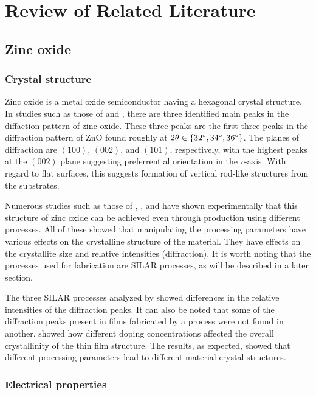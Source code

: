 \chapter{Review of Related Literature}

\section{Zinc oxide}

\subsection{Crystal structure}

Zinc oxide is a metal oxide semiconductor having a hexagonal crystal structure.
In studies such as those of  and , there are three identified main peaks in the diffaction pattern of zinc oxide.
These three peaks are the first three peaks in the diffraction pattern of ZnO found roughly at $2\theta \in \{32^{\circ} , 34^{\circ} , 36^{\circ}\}$.
The planes of diffraction are $(100)$, $(002)$, and $(101)$, respectively, with the highest peaks at the $(002)$ plane suggesting preferrential orientation in the \textit{c}-axis.
With regard to flat surfaces, this suggests formation of vertical rod-like structures from the substrates.

Numerous studies such as those of , , and  have shown experimentally that this structure of zinc oxide can be achieved even through production using different processes.
All of these showed that manipulating the processing parameters have various effects on the crystalline structure of the material.
They have effects on the crystallite size and relative intensities (diffraction).
It is worth noting that the processes used for fabrication are SILAR processes, as will be described in a later section.

The three SILAR processes analyzed by  showed differences in the relative intensities of the diffraction peaks.
It can also be noted that some of the diffraction peaks present in films fabricated by a process were not found in another.
 showed how different doping concentrations affected the overall crystallinity of the thin film structure.
The results, as expected, showed that different processing parameters lead to different material crystal structures.

\subsection{Electrical properties}

